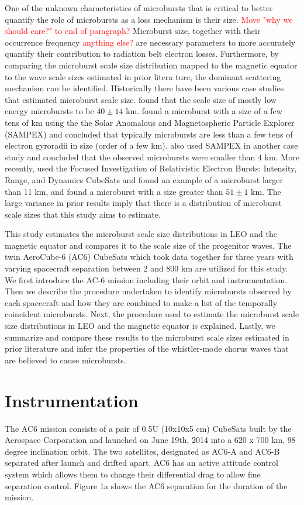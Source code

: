 \documentclass[draft]{agujournal2019}
\begin{document}
One of the unknown characteristics of microbursts that is critical to better quantify the role of microbursts as a loss mechanism is their size. \textcolor{red}{Move "why we should care?" to end of paragraph?} Microburst size, together with their occurrence frequency \textcolor{red}{anything else?} are necessary parameters to more accurately quantify their contribution to radiation belt electron losses. Furthermore, by comparing the microburst scale size distribution mapped to the magnetic equator to the wave scale sizes estimated in prior litera	ture, the dominant scattering mechanism can be identified. Historically there have been various case studies that estimated microburst scale size.  found that the scale size of mostly low energy microbursts to be $40 \pm 14$ km.  found a microburst with a size of a few tens of km using the the Solar Anomalous and Magnetospheric Particle Explorer (SAMPEX) and concluded that typically microbursts are less than a few tens of electron gyroradii in size (order of a few km).  also used SAMPEX in another case study and concluded that the observed microbursts were smaller than $4$ km. More recently,  used the Focused Investigation of Relativistic Electron Bursts: Intensity, Range, and Dynamics CubeSats and found an example of a microburst larger than 11 km, and  found a microburst with a size greater than $ 51 \pm 1$ km. The large variance in prior results imply that there is a distribution of microburst scale sizes that this study aims to estimate.

This study estimates the microburst scale size distributions in LEO and the magnetic equator and compares it to the scale size of the progenitor waves. The twin AeroCube-6 (AC6) CubeSats which took data together for three years with varying spacecraft separation between 2 and 800 km are utilized for this study. We first introduce the AC-6 mission including their orbit and instrumentation. Then we describe the procedure undertaken to identify microbursts observed by each spacecraft and how they are combined to make a list of the temporally coincident microbursts. Next, the procedure used to estimate the microburst scale size distributions in LEO and the magnetic equator is explained. Lastly, we summarize and compare these results to the microburst scale sizes estimated in prior literature and infer the properties of the whistler-mode chorus waves that are believed to cause microbursts. 

\section{Instrumentation}
The AC6 mission consists of a pair of 0.5U (10x10x5 cm) CubeSats built by the Aerospace Corporation and launched on June 19th, 2014 into a 620 x 700 km, 98 degree inclination orbit. The two satellites, designated as AC6-A and AC6-B separated after launch and drifted apart. AC6 has an active attitude control system which allows them to change their differential drag to allow fine separation control. Figure 1a shows the AC6 separation for the duration of the mission.
\end{document}
